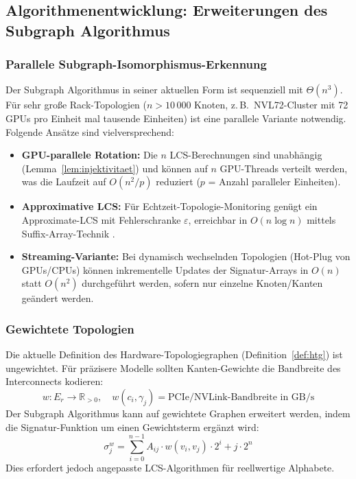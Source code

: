 ﻿\documentclass[a4paper,12pt]{article}
\theoremstyle{definition}
\begin{document}
\subsection{Algorithmenentwicklung: Erweiterungen des Subgraph Algorithmus}

\subsubsection{Parallele Subgraph-Isomorphismus-Erkennung}

Der Subgraph Algorithmus in seiner aktuellen Form \cite{epp2026subgraph}
ist sequenziell mit $\Theta(n^3)$. F\"ur sehr gro\ss e Rack-Topologien
($n > 10\,000$ Knoten, z.\,B.\ NVL72-Cluster mit 72 GPUs pro Einheit
mal tausende Einheiten) ist eine parallele Variante notwendig. Folgende
Ans\"atze sind vielversprechend:

\begin{itemize}
  \item \textbf{GPU-parallele Rotation:} Die $n$ LCS-Berechnungen sind
        unabh\"angig (Lemma~\ref{lem:injektivitaet}) und k\"onnen auf
        $n$ GPU-Threads verteilt werden, was die Laufzeit auf
        $O(n^2 / p)$ reduziert ($p$ = Anzahl paralleler Einheiten).
  \item \textbf{Approximative LCS:} F\"ur Echtzeit-Topologie-Monitoring
        gen\"ugt ein Approximate-LCS mit Fehlerschranke $\varepsilon$,
        erreichbar in $O(n \log n)$ mittels Suffix-Array-Technik
        \cite{navarro2001approx}.
  \item \textbf{Streaming-Variante:} Bei dynamisch wechselnden
        Topologien (Hot-Plug von GPUs/CPUs) k\"onnen inkrementelle
        Updates der Signatur-Arrays in $O(n)$ statt $O(n^2)$ durchgef\"uhrt
        werden, sofern nur einzelne Knoten/Kanten ge\"andert werden.
\end{itemize}

\subsubsection{Gewichtete Topologien}

Die aktuelle Definition des Hardware-Topologiegraphen (Definition~\ref{def:htg})
ist ungewichtet. F\"ur pr\"azisere Modelle sollten Kanten-Gewichte die
Bandbreite des Interconnects kodieren:
\[
  w: E_r \to \mathbb{R}_{>0}, \quad
  w(c_i, \gamma_j) = \text{PCIe/NVLink-Bandbreite in GB/s}
\]
Der Subgraph Algorithmus kann auf gewichtete Graphen erweitert werden,
indem die Signatur-Funktion um einen Gewichtsterm erg\"anzt wird:
\[
  \sigma_j^w = \sum_{i=0}^{n-1} A_{ij} \cdot w(v_i, v_j) \cdot 2^i + j \cdot 2^n
\]
Dies erfordert jedoch angepasste LCS-Algorithmen f\"ur reellwertige Alphabete.
\end{document}
